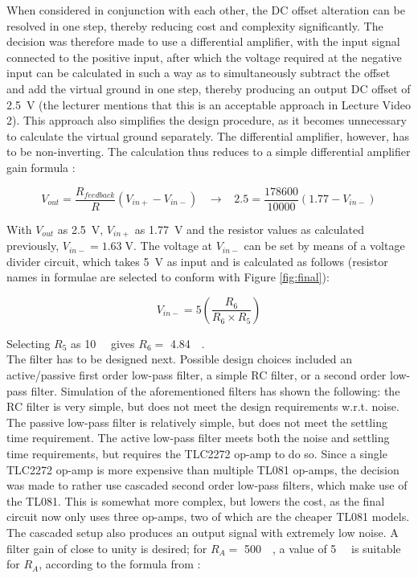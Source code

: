 When considered in conjunction with each other, the DC offset alteration can be resolved in one step, thereby reducing cost and complexity significantly. The decision was therefore made to use a differential amplifier, with the input signal connected to the positive input, after which the voltage required at the negative input can be calculated in such a way as to simultaneously subtract the offset and add the virtual ground in one step, thereby producing an output DC offset of \SI{2.5}{\volt} (the lecturer mentions that this is an acceptable approach in Lecture Video 2).  This approach also simplifies the design procedure, as it becomes unnecessary to calculate the virtual ground separately. The differential amplifier, however, has to be non-inverting. The calculation thus reduces to a simple differential amplifier gain formula \cite{opamp}: 

$$V_{out}=\frac{{R}_{feedback}}{{R}}\left({V}_{in+}-{V}_{in-}\right) \;\;\; \rightarrow \;\;\; 2.5=\frac{178600}{10000}\left(1.77-{V}_{in-}\right)$$

With $V_{out}$ as \SI{2.5}{\volt}, $V_{in+}$ as \SI{1.77}{\volt} and the resistor values as calculated previously, ${V}_{in-} = 1.63 \; \mathrm{V}$. The voltage at ${V}_{in-}$ can be set by means of a voltage divider circuit, which takes \SI{5}{\volt} as input and is calculated as follows (resistor names in formulae are selected to conform with Figure \ref{fig:final}):

$${V}_{in-} = 5 (\frac{R_{6}}{R_{6}\times R_{5}})$$

Selecting $R_5$ as \SI{10}{\kilo \Omega} gives $R_6 =$ \SI{4.84}{\kilo \Omega}.\\

The filter has to be designed next. Possible design choices included an active/passive first order low-pass filter, a simple RC filter, or a second order low-pass filter. Simulation of the aforementioned filters has shown the following: the RC filter is very simple, but does not meet the design requirements w.r.t. noise. The passive low-pass filter is relatively simple, but does not meet the settling time requirement. The active low-pass filter meets both the noise and settling time requirements, but requires the TLC2272 op-amp to do so. Since a single TLC2272 op-amp is more expensive than multiple TL081 op-amps, the decision was made to rather use cascaded second order low-pass filters, which  make use of the TL081. This is somewhat more complex, but lowers the cost, as the final circuit now only uses three op-amps, two of which are the cheaper TL081 models. The cascaded setup also produces an output signal with extremely low noise.  A filter gain of close to unity is desired; for $R_A = $ \SI{500}{\kilo\Omega}, a value of \SI{5}{\kilo\Omega} is suitable for $R_A$, according to the formula from \cite{filter}:

